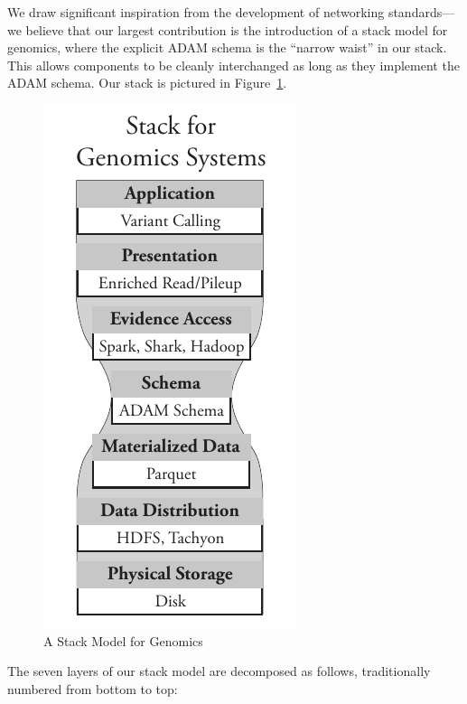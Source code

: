 \documentclass{bioinfo}
\begin{document}
We draw significant inspiration from the development of networking standards---we believe that our largest contribution is the introduction of a
stack model for genomics, where the explicit ADAM schema is the ``narrow waist'' in our stack. This allows components to be cleanly
interchanged as long as they implement the ADAM schema. Our stack is pictured in Figure~\ref{fig:stack-model}.

\begin{figure}[h]
\begin{center}
\includegraphics[width=0.4\linewidth]{stack-model.pdf}
\end{center}
\caption{A Stack Model for Genomics}
\label{fig:stack-model}
\end{figure}

The seven layers of our stack model are decomposed as follows, traditionally numbered from bottom to top:
\end{document}
